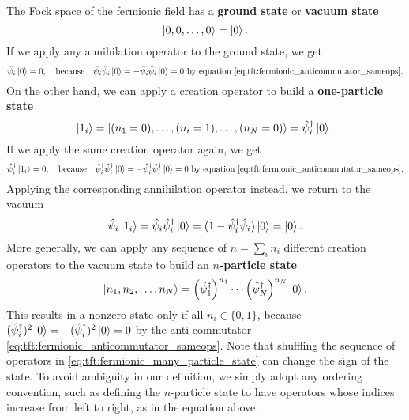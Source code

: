 The Fock space of the fermionic field has a \textbf{ground state} or \textbf{vacuum state}
\begin{equation}
	\ket{0, 0, \ldots, 0} = \ket{0}. \\
\end{equation}
If we apply any annihilation operator to the ground state, we get
\begin{equation}
	\hat\psi_i \ket{0} = 0, \quad \text{because} \quad \hat\psi_i \hat\psi_i \ket{0} = -\hat\psi_i \hat\psi_i \ket{0} = 0 \text{ by equation \eqref{eq:tft:fermionic_anticommutator_sameops}}.
\label{eq:tft:destroy_zero}
\end{equation}
On the other hand, we can apply a creation operator to build a \textbf{one-particle state}
\begin{equation}
	\ket{1_i} = \ket{(n_1=0), \ldots, (n_i=1), \ldots, (n_N=0)} = \hat\psi^\dagger_i \ket{0} .
\label{eq:tft:one_particle_state}
\end{equation}
If we apply the same creation operator again, we get
\begin{equation}
	\hat\psi^\dagger_i \ket{1_i} = 0, \quad \text{because} \quad \hat\psi^\dagger_i \hat\psi^\dagger_i \ket{0} = -\hat\psi^\dagger_i \hat\psi^\dagger_i \ket{0} = 0 \text{ by equation \eqref{eq:tft:fermionic_anticommutator_sameops}}.
\label{eq:tft:create_one}
\end{equation}
Applying the corresponding annihilation operator instead, we return to the vacuum
\begin{equation}
	\hat\psi_i \ket{1_i} = \hat\psi_i \hat\psi^\dagger_i \ket{0} = (1 - \hat\psi^\dagger_i \hat\psi_i) \ket{0} = \ket{0} .
\label{eq:tft:destroy_one}
\end{equation}
More generally, we can apply any sequence of $n = \sum_i n_i$ different creation operators to the vacuum state to build an \textbf{$n$-particle state}
\begin{equation}
	\ket{n_1, n_2, \ldots, n_N} = \left( \hat\psi^\dagger_1 \right)^{n_1} \cdots \left( \hat\psi^\dagger_N \right)^{n_N} \ket{0} .
\label{eq:tft:fermionic_many_particle_state}
\end{equation}
This results in a nonzero state only if all $n_i \in \{0, 1\}$, because $(\hat\psi^\dagger_i)^2 \ket{0} = -(\hat\psi^\dagger_i)^2 \ket{0} = 0$ by the anti-commutator \eqref{eq:tft:fermionic_anticommutator_sameops}.
Note that shuffling the sequence of operators in \cref{eq:tft:fermionic_many_particle_state} can change the sign of the state.
To avoid ambiguity in our definition, we simply adopt any ordering convention, such as defining the $n$-particle state to have operators whose indices increase from left to right, as in the equation above.

